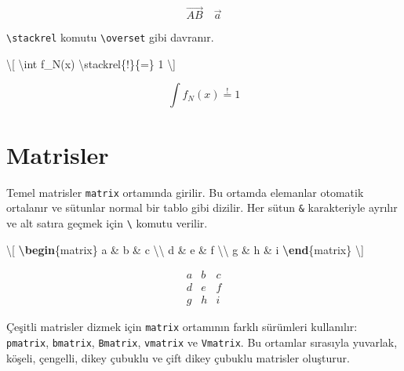 \documentclass[
  10pt,
]{scrbook}
\newenvironment{Shaded}{\begin{snugshade}}{\end{snugshade}}
\newcommand{\ExtensionTok}[1]{#1}
\newcommand{\KeywordTok}[1]{\textcolor[rgb]{0.13,0.29,0.53}{\textbf{#1}}}
\newcommand{\NormalTok}[1]{#1}
\newcommand{\SpecialCharTok}[1]{\textcolor[rgb]{0.00,0.00,0.00}{#1}}
\newcommand{\SpecialStringTok}[1]{\textcolor[rgb]{0.31,0.60,0.02}{#1}}
\theoremstyle{definition}
\theoremstyle{definition}
\theoremstyle{definition}
\theoremstyle{definition}
\theoremstyle{remark}
\begin{document}
\[
\overrightarrow{AB} \quad \vec{a}
\]

\texttt{\textbackslash{}stackrel} komutu \texttt{\textbackslash{}overset} gibi davranır.

\begin{Shaded}
\begin{Highlighting}[]
\SpecialStringTok{\textbackslash{}[}
\SpecialCharTok{\textbackslash{}int}\SpecialStringTok{ f\_N(x) }\SpecialCharTok{\textbackslash{}stackrel}\SpecialStringTok{\{!\}\{=\} 1}
\SpecialStringTok{\textbackslash{}]}
\end{Highlighting}
\end{Shaded}

\[
\int f_N(x) \stackrel{!}{=} 1
\]

\hypertarget{matrisler}{%
\section{Matrisler}\label{matrisler}}

Temel matrisler \texttt{matrix} ortamında girilir. Bu ortamda elemanlar otomatik ortalanır ve sütunlar normal bir tablo gibi dizilir. Her sütun \texttt{\&} karakteriyle ayrılır ve alt satıra geçmek için \texttt{\textbackslash{}} komutu verilir.

\begin{Shaded}
\begin{Highlighting}[]
\SpecialStringTok{\textbackslash{}[}
\KeywordTok{\textbackslash{}begin}\NormalTok{\{}\ExtensionTok{matrix}\NormalTok{\}}
\SpecialStringTok{a \& b \& c }\SpecialCharTok{\textbackslash{}\textbackslash{}}
\SpecialStringTok{d \& e \& f }\SpecialCharTok{\textbackslash{}\textbackslash{}}
\SpecialStringTok{g \& h \& i}
\KeywordTok{\textbackslash{}end}\NormalTok{\{}\ExtensionTok{matrix}\NormalTok{\}}
\SpecialStringTok{\textbackslash{}]}
\end{Highlighting}
\end{Shaded}

\[
\begin{matrix}
a & b & c \\
d & e & f \\
g & h & i
\end{matrix}
\]

Çeşitli matrisler dizmek için \texttt{matrix} ortamının farklı sürümleri kullanılır: \texttt{pmatrix}, \texttt{bmatrix}, \texttt{Bmatrix}, \texttt{vmatrix} ve \texttt{Vmatrix}. Bu ortamlar sırasıyla yuvarlak, köşeli, çengelli, dikey çubuklu ve çift dikey çubuklu matrisler oluşturur.
\end{document}
